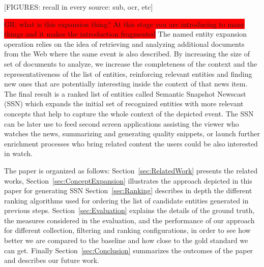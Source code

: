 \documentclass{llncs}
\newcommand{\todo}[1]{\colorbox{red}{#1}}
\begin{document}
[FIGURES: recall in every source: sub, ocr, etc]

\todo{GR: what is this expansion thing? At this stage you are introducing to many things and it makes the introduction fragmented}
The named entity expansion operation relies on the idea of retrieving and analyzing additional documents from the Web where the same event is also described. By increasing the size of set of documents to analyze, we increase the completeness of the context and the representativeness of the list of entities, reinforcing relevant entities and finding new ones that are potentially interesting inside the context of that news item. The final result is a ranked list of entities called  Semantic Snapshot Newscast (SSN) which expands the initial set of recognized entities with more relevant concepts that help to capture the whole context of the depicted event. The SSN can be later use to feed second screen applications assisting the viewer who watches the news, summarizing and generating quality snippets, or launch further  enrichment processes who bring related content the users could be also interested in watch. 

The paper is organized as follows: Section~\ref{sec:RelatedWork} presents the related works, Section~\ref{sec:ConceptExpansion} illustrates the approach depicted in this paper for generating SSN
Section~\ref{sec:Ranking} describes in depth the different ranking algorithms used for ordering the list of candidate entities generated in previous steps. Section~\ref{sec:Evaluation} explains the details of the ground truth, the measures considered in the evaluation, and the performance of our approach for different collection, filtering and ranking configurations, in order to see how better we are compared to the baseline and how close to the gold standard we can get. Finally Section~\ref{sec:Conclusion} summarizes the outcomes of the paper and describes our future work.

\end{document}
